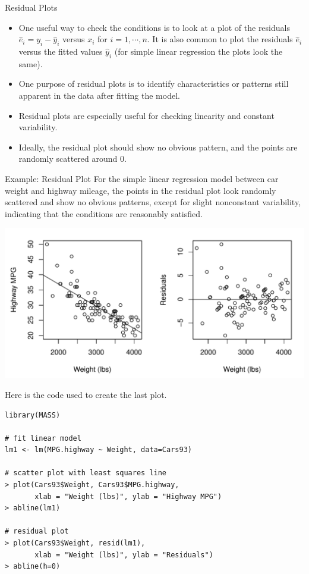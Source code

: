 \documentclass[10pt]{beamer}
\begin{document}
\begin{frame}{Residual Plots}
\begin{itemize}
\item One useful way to check the conditions is to look at a plot of the residuals $\hat{e}_i = y_i - \hat{y}_i$ versus $x_i$ for $i=1, \cdots, n$.  It is also common to plot the residuals $\hat{e}_i$ versus the fitted values $\hat{y}_i$ (for simple linear regression the plots look the same).
\vspace{5pt}
\item One purpose of residual plots is to identify characteristics or patterns still apparent in the data after fitting the model.
\vspace{5pt}
\item Residual plots are especially useful for checking linearity and constant variability.
\vspace{5pt}
\item Ideally, the residual plot should show no obvious pattern, and the points are randomly scattered around 0.
\end{itemize}
\end{frame}

\begin{frame}{Example: Residual Plot}
For the simple linear regression model between car weight and highway mileage, the points in the residual plot look randomly scattered and show no obvious patterns, except for slight nonconstant variability, indicating that the conditions are reasonably satisfied.

\centering
\includegraphics[scale=0.6]{figure/mpg_lmplots.pdf}
\end{frame}

\begin{frame}[fragile]
Here is the code used to create the last plot.
\begin{verbatim}
library(MASS)

# fit linear model
lm1 <- lm(MPG.highway ~ Weight, data=Cars93)

# scatter plot with least squares line
> plot(Cars93$Weight, Cars93$MPG.highway, 
       xlab = "Weight (lbs)", ylab = "Highway MPG")
> abline(lm1)

# residual plot
> plot(Cars93$Weight, resid(lm1),
       xlab = "Weight (lbs)", ylab = "Residuals")
> abline(h=0)
\end{verbatim}
\end{frame}
\end{document}
